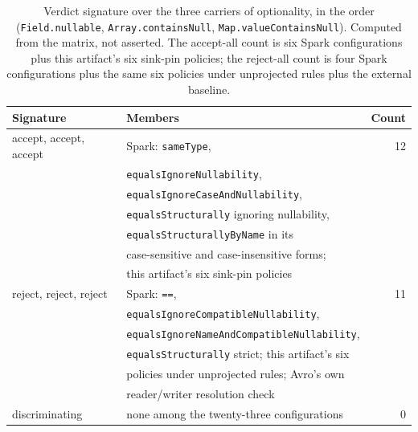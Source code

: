 \begin{table}[t]
  \caption{Verdict signature over the three carriers of optionality, in the order (\texttt{Field.nullable}, \texttt{Array.containsNull}, \texttt{Map.valueContainsNull}). Computed from the matrix, not asserted. The accept-all count is six Spark configurations plus this artifact's six sink-pin policies; the reject-all count is four Spark configurations plus the same six policies under unprojected rules plus the external baseline.}
  \label{tab:signatures}
  \centering
  \scriptsize
  \begin{tabular}{@{}llr@{}}
    \toprule
    Signature & Members & Count \\
    \midrule
    accept, accept, accept & Spark: \texttt{sameType}, & 12 \\
     & \texttt{equalsIgnoreNullability}, & \\
     & \texttt{equalsIgnoreCaseAndNullability}, & \\
     & \texttt{equalsStructurally} ignoring nullability, & \\
     & \texttt{equalsStructurallyByName} in its & \\
     & case-sensitive and case-insensitive forms; & \\
     & this artifact's six sink-pin policies & \\
    reject, reject, reject & Spark: \texttt{==}, & 11 \\
     & \texttt{equalsIgnoreCompatibleNullability}, & \\
     & \texttt{equals\allowbreak Ignore\allowbreak Name\allowbreak And\allowbreak Compatible\allowbreak Nullability}, & \\
     & \texttt{equalsStructurally} strict; this artifact's six & \\
     & policies under unprojected rules; Avro's own & \\
     & reader/writer resolution check & \\
    \midrule
    discriminating & none among the twenty-three configurations & 0 \\
    \bottomrule
  \end{tabular}
\end{table}

